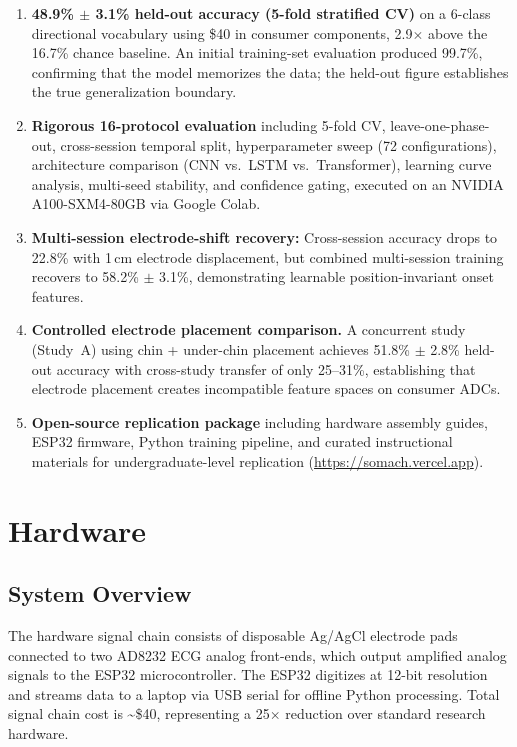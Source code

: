 \documentclass{article}
\begin{document}
\begin{enumerate}
    \item \textbf{48.9\% $\pm$ 3.1\% held-out accuracy (5-fold stratified CV)} on a 6-class directional vocabulary using \$40 in consumer components, 2.9$\times$ above the 16.7\% chance baseline. An initial training-set evaluation produced 99.7\%, confirming that the model memorizes the data; the held-out figure establishes the true generalization boundary.
    \item \textbf{Rigorous 16-protocol evaluation} including 5-fold CV, leave-one-phase-out, cross-session temporal split, hyperparameter sweep (72 configurations), architecture comparison (CNN vs.\ LSTM vs.\ Transformer), learning curve analysis, multi-seed stability, and confidence gating, executed on an NVIDIA A100-SXM4-80GB via Google Colab.
    \item \textbf{Multi-session electrode-shift recovery:} Cross-session accuracy drops to 22.8\% with 1\,cm electrode displacement, but combined multi-session training recovers to 58.2\% $\pm$ 3.1\%, demonstrating learnable position-invariant onset features.
    \item \textbf{Controlled electrode placement comparison.} A concurrent study (Study~A) using chin + under-chin placement achieves 51.8\% $\pm$ 2.8\% held-out accuracy with cross-study transfer of only 25--31\%, establishing that electrode placement creates incompatible feature spaces on consumer ADCs.
    \item \textbf{Open-source replication package} including hardware assembly guides, ESP32 firmware, Python training pipeline, and curated instructional materials for undergraduate-level replication (\url{https://somach.vercel.app}).
\end{enumerate}

\section{Hardware}
\label{sec:hardware}

\subsection{System Overview}

The hardware signal chain consists of disposable Ag/AgCl electrode pads connected to two AD8232 ECG analog front-ends, which output amplified analog signals to the ESP32 microcontroller. The ESP32 digitizes at 12-bit resolution and streams data to a laptop via USB serial for offline Python processing. Total signal chain cost is \textasciitilde\$40, representing a 25$\times$ reduction over standard research hardware.
\end{document}
